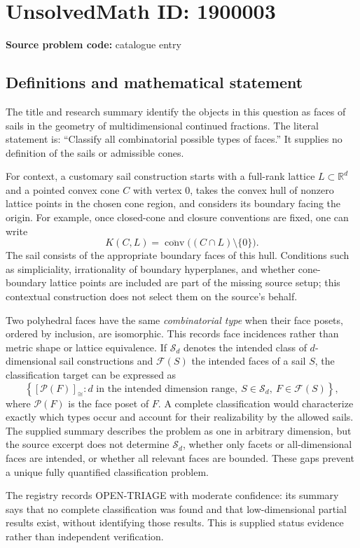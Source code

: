 \documentclass[11pt]{article}
\newcommand{\R}{\mathbb{R}}
\begin{document}
\section*{UnsolvedMath ID: 1900003}
\textbf{Source problem code:} catalogue entry
\subsection{Definitions and mathematical statement}
The title and research summary identify the objects in this question as faces of sails in the geometry of multidimensional continued fractions. The literal statement is: ``Classify all combinatorial possible types of faces.'' It supplies no definition of the sails or admissible cones.

For context, a customary sail construction starts with a full-rank lattice $L\subset\R^d$ and a pointed convex cone $C$ with vertex $0$, takes the convex hull of nonzero lattice points in the chosen cone region, and considers its boundary facing the origin. For example, once closed-cone and closure conventions are fixed, one can write
\[
 K(C,L)=\overline{\operatorname{conv}}\bigl((C\cap L)\setminus\{0\}\bigr).
\]
The sail consists of the appropriate boundary faces of this hull. Conditions such as simpliciality, irrationality of boundary hyperplanes, and whether cone-boundary lattice points are included are part of the missing source setup; this contextual construction does not select them on the source's behalf.

Two polyhedral faces have the same \emph{combinatorial type} when their face posets, ordered by inclusion, are isomorphic. This records face incidences rather than metric shape or lattice equivalence. If $\mathscr S_d$ denotes the intended class of $d$-dimensional sail constructions and $\mathscr F(S)$ the intended faces of a sail $S$, the classification target can be expressed as
\[
 \left\{[\mathcal P(F)]_{\cong}:d\text{ in the intended dimension range},\ 
 S\in\mathscr S_d,\ F\in\mathscr F(S)\right\},
\]
where $\mathcal P(F)$ is the face poset of $F$. A complete classification would characterize exactly which types occur and account for their realizability by the allowed sails. The supplied summary describes the problem as one in arbitrary dimension, but the source excerpt does not determine $\mathscr S_d$, whether only facets or all-dimensional faces are intended, or whether all relevant faces are bounded. These gaps prevent a unique fully quantified classification problem.

The registry records OPEN-TRIAGE with moderate confidence: its summary says that no complete classification was found and that low-dimensional partial results exist, without identifying those results. This is supplied status evidence rather than independent verification.
\end{document}
